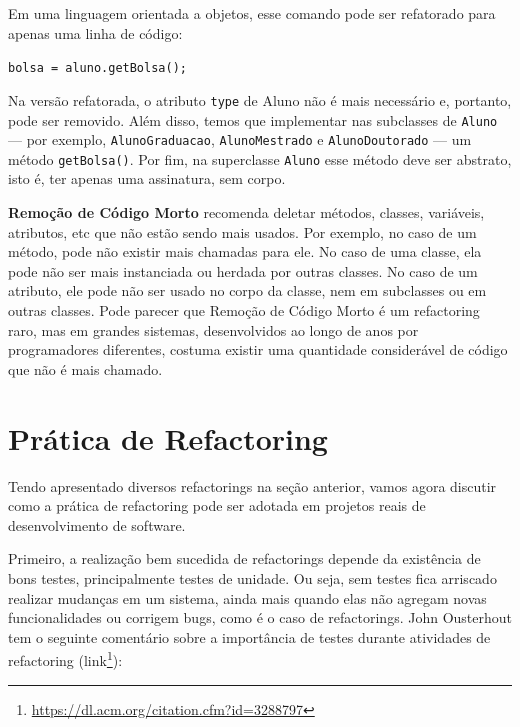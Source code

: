 \documentclass[
  11pt,
  twoside]{book}
\newcommand{\passthrough}[1]{#1}
\DeclareRobustCommand{\href}[2]{#2\footnote{\url{#1}}}
\begin{document}
Em uma linguagem orientada a objetos, esse comando pode ser refatorado
para apenas uma linha de código:

\passthrough{\lstinline!bolsa = aluno.getBolsa();!}

Na versão refatorada, o atributo \passthrough{\lstinline!type!} de Aluno
não é mais necessário e, portanto, pode ser removido. Além disso, temos
que implementar nas subclasses de \passthrough{\lstinline!Aluno!} ---
por exemplo, \passthrough{\lstinline!AlunoGraduacao!},
\passthrough{\lstinline!AlunoMestrado!} e
\passthrough{\lstinline!AlunoDoutorado!} --- um método
\passthrough{\lstinline!getBolsa()!}. Por fim, na superclasse
\passthrough{\lstinline!Aluno!} esse método deve ser abstrato, isto é,
ter apenas uma assinatura, sem corpo.

 \textbf{Remoção de Código
Morto} recomenda deletar métodos, classes, variáveis, atributos, etc que
não estão sendo mais usados. Por exemplo, no caso de um método, pode não
existir mais chamadas para ele. No caso de uma classe, ela pode não ser
mais instanciada ou herdada por outras classes. No caso de um atributo,
ele pode não ser usado no corpo da classe, nem em subclasses ou em
outras classes. Pode parecer que Remoção de Código Morto é um
refactoring raro, mas em grandes sistemas, desenvolvidos ao longo de
anos por programadores diferentes, costuma existir uma quantidade
considerável de código que não é mais chamado.

\hypertarget{pruxe1tica-de-refactoring}{%
\section{Prática de Refactoring}\label{pruxe1tica-de-refactoring}}

Tendo apresentado diversos refactorings na seção anterior, vamos agora
discutir como a prática de refactoring pode ser adotada em projetos
reais de desenvolvimento de software.

Primeiro, a realização bem sucedida de refactorings depende da
existência de bons testes, principalmente testes de unidade. Ou seja,
sem testes fica arriscado realizar mudanças em um sistema, ainda mais
quando elas não agregam novas funcionalidades ou corrigem bugs, como é o
caso de refactorings. John Ousterhout tem o seguinte comentário sobre a
importância de testes durante atividades de refactoring
(\href{https://dl.acm.org/citation.cfm?id=3288797}{link}):

\end{document}
